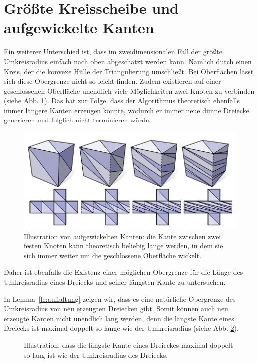 \section*{Größte Kreisscheibe und aufgewickelte Kanten}
Ein weiterer Unterschied ist, dass im zweidimensionalen Fall der größte Umkreisradius  einfach nach oben abgeschätzt werden kann. Nämlich durch einen Kreis, der die konvexe Hülle der Triangulierung umschließt. Bei Oberflächen lässt sich diese Obergrenze nicht so leicht finden. Zudem existieren auf einer geschlossenen Oberfläche unendlich viele Möglichkeiten zwei Knoten zu verbinden (siehe Abb. \ref{fig:aufgewickeltung}). Das hat zur Folge, dass der Algorithmus theoretisch ebenfalls immer längere Kanten erzeugen könnte, wodurch er immer neue dünne Dreiecke generieren und folglich nicht terminieren würde.\\
 \begin{figure}[H]
    \centering
    \includegraphics[width=5in]{images/aufgewickeltes_dreieck.png}
    \caption{ Illustration von aufgewickelten Kanten: die Kante zwischen zwei festen Knoten kann theoretisch beliebig lange werden, in dem sie sich immer weiter um die geschlossene Oberfläche wickelt.~\cite{Sharp:2019:NIT} }
    \label{fig:aufgewickeltung}
\end{figure}


Daher ist ebenfalls die Existenz einer möglichen Obergrenze für die Länge des Umkreisradius eines Dreiecks und seiner längsten Kante zu untersuchen. 

In Lemma~\ref{le:auffaltung} zeigen wir, dass es eine natürliche Obergrenze des Umkreisradius von neu erzeugten Dreiecken gibt. Somit können auch neu erzeugte Kanten nicht unendlich lang werden, denn die längste Kante eines Dreiecks ist maximal doppelt so lange wie der Umkreisradius (siehe Abb. \ref{fig:langsteKante}).
 \begin{figure}[H]
    \centering
    
    \caption{ Illustration, dass die längste Kante eines Dreieckes maximal doppelt so lang ist wie der Umkreisradius des Dreiecks.}%
    \label{fig:langsteKante}
\end{figure}
 



